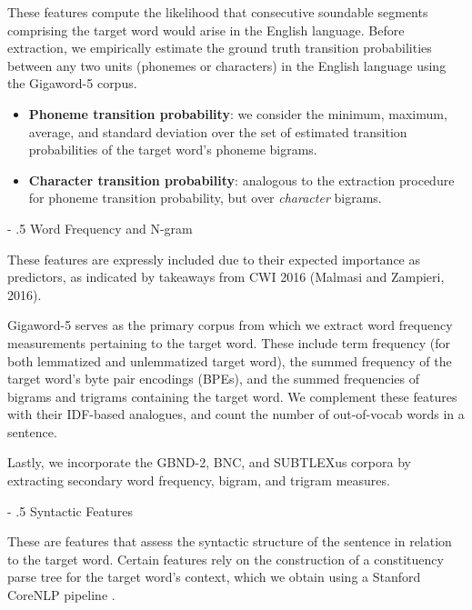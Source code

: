 \documentclass[11pt,a4paper]{article}
\makeatletter
\renewcommand\paragraph{%
    \@startsection{paragraph}{4}{0mm}%
        {-\baselineskip}%
        {.5\baselineskip}%
        {\normalfont\normalsize\bfseries}}
\makeatother
\begin{document}
These features compute the likelihood that consecutive soundable segments comprising the target word would arise in the English language. Before extraction, we empirically estimate the ground truth transition probabilities between any two units (phonemes or characters) in the English language using the Gigaword-5 corpus. 

\begin{itemize}
  \item \textbf{Phoneme transition probability}: we consider the minimum, maximum, average, and standard deviation over the set of estimated transition probabilities of the target word's phoneme bigrams.
  \item \textbf{Character transition probability}: analogous to the extraction procedure for phoneme transition probability, but over \textit{character} bigrams.
\end{itemize}

\paragraph{Word Frequency and N-gram}

These features are expressly included due to their expected importance as predictors, as indicated by takeaways from CWI 2016 (Malmasi and Zampieri, 2016).

Gigaword-5 serves as the primary corpus from which we extract word frequency measurements pertaining to the target word. These include term frequency (for both lemmatized and unlemmatized target word), the summed frequency of the target word's byte pair encodings (BPEs), and the summed frequencies of bigrams and trigrams containing the target word. We complement these features with their IDF-based analogues, and count the number of out-of-vocab words in a sentence.

Lastly, we incorporate the GBND-2, BNC, and SUBTLEXus corpora by extracting secondary word frequency, bigram, and trigram measures. 

\paragraph{Syntactic Features}

These are features that assess the syntactic structure of the sentence in relation to the target word. Certain features rely on the construction of a constituency parse tree for the target word's context, which we obtain using a Stanford CoreNLP pipeline \citep{manning-EtAl:2014:P14-5}.
\end{document}
